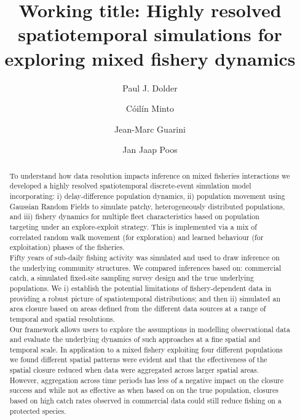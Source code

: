 \documentclass[review]{elsarticle}
\begin{document}
\begin{frontmatter}
\title{Working title: Highly resolved spatiotemporal simulations for
	exploring mixed fishery dynamics}

\author[1,2]{Paul J. Dolder}

\author[1]{Cóilín Minto}
\author[3]{Jean-Marc Guarini}
\author[4,5]{Jan Jaap Poos}

\address[1]{Galway-Mayo Institute of Technology (GMIT), Dublin Road, Galway,
	Ireland} 
\address[2]{Centre for Environment, Fisheries and Aquaculture Science (Cefas),
	Pakefield Road, Lowestoft, UK}
\address[3]{Sorbonne Université, Faculty of Sciences, 4 Place Jussieu, 75005
	Paris, France}
\address[4]{Wageningen Marine Research, Haringkade 1 1976 CP IJmuiden,
	Netherlands}
\address[5]{Aquaculture and Fisheries Group, Wageningen University \& Research,
	Zodiac Building 122, De Elst 1, 6708 WD Wageningen, the Netherlands}


\begin{abstract}

To understand how data resolution impacts inference on mixed fisheries
interactions we developed a highly resolved spatiotemporal discrete-event
simulation model incorporating: i) delay-difference population dynamics, ii)
population movement using Gaussian Random Fields to simulate patchy,
heterogeneously distributed populations, and iii) fishery dynamics for multiple
fleet characteristics based on population targeting under an explore-exploit
strategy. This is implemented via a mix of correlated random walk movement (for
exploration) and learned behaviour (for exploitation) phases of the fisheries.
\\ 
Fifty years of sub-daily fishing activity was simulated and used to draw
inference on the underlying community structures. We compared inferences based
on: commercial catch, a simulated fixed-site sampling survey design and the
true underlying populations. We i) establish the potential limitations of
fishery-dependent data in providing a robust picture of spatiotemporal
distributions; and then ii) simulated an area closure based on areas defined
from the different data sources at a range of temporal and spatial resolutions.
\\
Our framework allows users to explore the assumptions in modelling
observational data and evaluate the underlying dynamics of such approaches at a
fine spatial and temporal scale. In application to a mixed fishery exploiting
four different populations we found different spatial patterns were evident and
that the effectiveness of the spatial closure reduced when data were aggregated
across larger spatial areas. However, aggregation across time periods has less
of a negative impact on the closure success and while not as effective as when
based on on the true population, closures based on high catch rates observed in
commercial data could still reduce fishing on a protected species. \\ 


\end{abstract}
\end{frontmatter}
\end{document}
